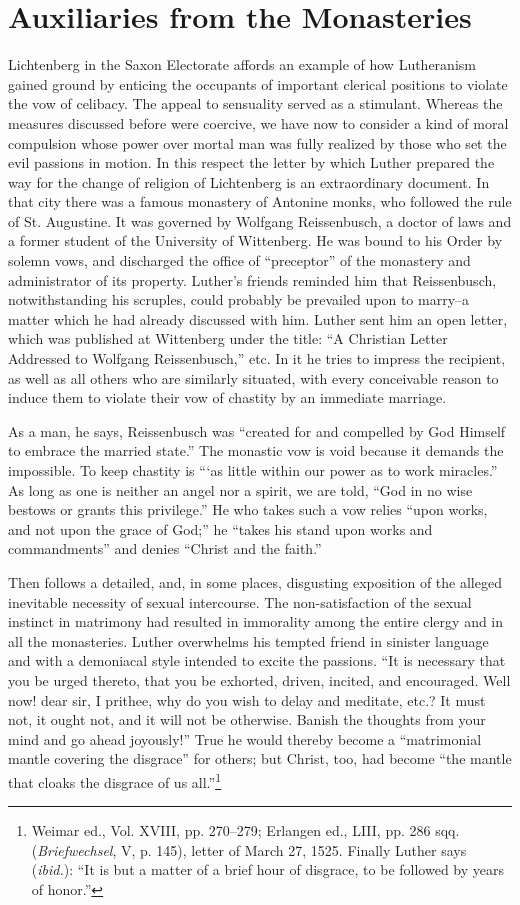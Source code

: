 \section{Auxiliaries from the Monasteries}

Lichtenberg in the Saxon Electorate affords an example of how
Lutheranism gained ground by enticing the occupants of important
clerical positions to violate the vow of celibacy. The appeal to sensuality
served as a stimulant. Whereas the measures discussed before
were coercive, we have now to consider a kind of moral compulsion
whose power over mortal man was fully realized by those who set the
evil passions in motion. In this respect the letter by which Luther
prepared the way for the change of religion of Lichtenberg is an
extraordinary document. In that city there was a famous monastery
of Antonine monks, who followed the rule of St. Augustine. It was
governed by Wolfgang Reissenbusch, a doctor of laws and a former
student of the University of Wittenberg. He was bound to his Order
by solemn vows, and discharged the office of “preceptor” of the
monastery and administrator of its property. Luther’s friends reminded
him that Reissenbusch, notwithstanding his scruples, could
probably be prevailed upon to marry--a matter which he had already
discussed with him. Luther sent him an open letter, which was published
at Wittenberg under the title: “A Christian Letter Addressed
to Wolfgang Reissenbusch,” etc. In it he tries to impress the recipient,
as well as all others who are similarly situated, with every conceivable
reason to induce them to violate their vow of chastity by an immediate marriage.

As a man, he says, Reissenbusch was “created for and compelled by God
Himself to embrace the married state.” The monastic vow is void because it
demands the impossible. To keep chastity is “‘as little within our power as
to work miracles.” As long as one is neither an angel nor a spirit, we are
told, “God in no wise bestows or grants this privilege.” He who takes such a
vow relies “upon works, and not upon the grace of God;” he “takes his
stand upon works and commandments” and denies “Christ and the faith.”

Then follows a detailed, and, in some places, disgusting exposition of the
alleged inevitable necessity of sexual intercourse. The non-satisfaction of
the sexual instinct in matrimony had resulted in immorality among the
entire clergy and in all the monasteries. Luther overwhelms his tempted
friend in sinister language and with a demoniacal style intended to excite the
passions. “It is necessary that you be urged thereto, that you be exhorted,
driven, incited, and encouraged. Well now! dear sir, I prithee, why do
you wish to delay and meditate, etc.? It must not, it ought not, and it will
not be otherwise. Banish the thoughts from your mind and go ahead joyously!”
True he would thereby become a “matrimonial mantle covering the
disgrace” for others; but Christ, too, had become “the mantle that cloaks the
disgrace of us all.”\footnote
{Weimar ed., Vol. XVIII, pp. 270--279; Erlangen ed., LIII, pp. 286 sqq. (\textit{Briefwechsel},
V, p. 145), letter of March 27, 1525. Finally Luther says (\textit{ibid.}): “It is but a matter of a
brief hour of disgrace, to be followed by years of honor.”}

